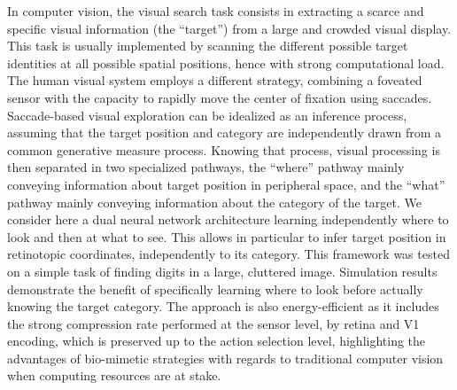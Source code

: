 In computer vision, the visual search task consists in extracting a scarce and specific visual information (the ``target'') from a large and crowded visual display. This task is usually implemented by scanning the different possible target identities at all possible spatial positions, hence with strong computational load. The human visual system employs a different strategy, combining a foveated sensor with the capacity to rapidly move the center of fixation using saccades. Saccade-based visual exploration can be idealized as an inference process, assuming that the target position and category are independently drawn from a common generative measure process. Knowing that process, visual processing is then separated in two specialized pathways, the ``where'' pathway mainly conveying information about target position in peripheral space, and the ``what'' pathway mainly conveying information about the category of the target. We consider here a dual neural network architecture learning independently where to look and then at what to see. This allows in particular to infer target position in retinotopic coordinates, independently to its category. This framework was tested on a simple task of finding digits in a large, cluttered image. Simulation results demonstrate the benefit of specifically learning where to look before actually knowing the target category. The approach is also energy-efficient as it includes the strong compression rate performed at the sensor level, by retina and V1 encoding, which is preserved up to the action selection level, highlighting the advantages of bio-mimetic strategies with regards to traditional computer vision when computing resources are at stake.
